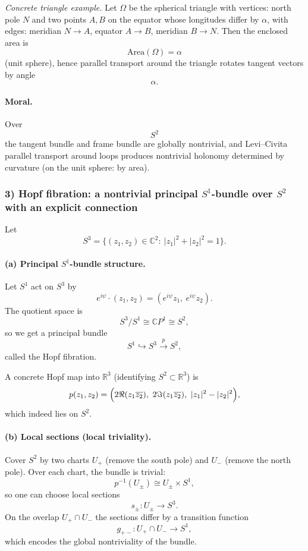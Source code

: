 \documentclass[12pt,a4paper]{article}
\theoremstyle{plain}
\theoremstyle{definition}      %
\begin{document}
\emph{Concrete triangle example.}
Let $\Omega$ be the spherical triangle with vertices:
north pole $N$ and two points $A,B$ on the equator whose longitudes differ by $\alpha$,
with edges: meridian $N\to A$, equator $A\to B$, meridian $B\to N$.
Then the enclosed area is
\[
\mathrm{Area}(\Omega)=\alpha
\]
(unit sphere), hence parallel transport around the triangle rotates tangent vectors by angle
\[
\alpha.
\]

\paragraph{Moral.}
Over
\[
S^2
\]
the tangent bundle and frame bundle are globally nontrivial, and Levi--Civita parallel transport around loops produces nontrivial holonomy determined by curvature (on the unit sphere: by area).


\subsubsection*{3) Hopf fibration: a nontrivial principal $S^1$-bundle over $S^2$ with an explicit connection}

Let
\[
S^3=\{(z_1,z_2)\in \mathbb{C}^2:\ |z_1|^2+|z_2|^2=1\}.
\]

\paragraph{(a) Principal $S^1$-bundle structure.}
Let $S^1$ act on $S^3$ by
\[
e^{i\psi}\cdot (z_1,z_2) = (e^{i\psi}z_1,\ e^{i\psi}z_2).
\]
The quotient space is
\[
S^3/S^1 \cong \mathbb{C}P^1 \cong S^2,
\]
so we get a principal bundle
\[
S^1 \hookrightarrow S^3 \xrightarrow{\,p\,} S^2,
\]
called the Hopf fibration.

A concrete Hopf map into $\mathbb{R}^3$ (identifying $S^2\subset \mathbb{R}^3$) is
\[
p(z_1,z_2)=
\Bigl(
2\Re(z_1\overline{z_2}),\ 
2\Im(z_1\overline{z_2}),\ 
|z_1|^2-|z_2|^2
\Bigr),
\]
which indeed lies on $S^2$.

\paragraph{(b) Local sections (local triviality).}
Cover $S^2$ by two charts $U_+$ (remove the south pole) and $U_-$ (remove the north pole).
Over each chart, the bundle is trivial:
\[
p^{-1}(U_\pm)\cong U_\pm\times S^1,
\]
so one can choose local sections
\[
s_\pm:U_\pm\to S^3.
\]
On the overlap $U_+\cap U_-$ the sections differ by a transition function
\[
g_{+-}:U_+\cap U_-\to S^1,
\]
which encodes the global nontriviality of the bundle.
\end{document}

